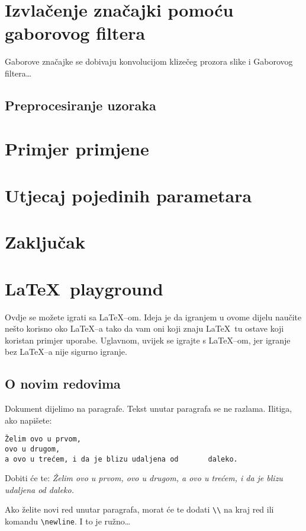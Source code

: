 \documentclass{article}
\begin{document}
\section{Izvlačenje značajki pomoću gaborovog filtera}
Gaborove značajke se dobivaju konvolucijom klizečeg prozora slike i Gaborovog
filtera\ldots

\subsection{Preprocesiranje uzoraka}

\section{Primjer primjene}

\section{Utjecaj pojedinih parametara}

\section{Zaključak}




\newpage
\appendix
\section{\LaTeX~playground}
Ovdje se možete igrati sa \LaTeX--om. Ideja je da igranjem u ovome dijelu
naučite nešto korisno oko \LaTeX--a tako da vam oni koji znaju \LaTeX~tu ostave
koji koristan primjer uporabe. Uglavnom, uvijek se igrajte s \LaTeX--om, jer igranje bez \LaTeX--a nije sigurno igranje. 

\subsection{O novim redovima}
Dokument dijelimo na paragrafe. Tekst unutar paragrafa se ne razlama. Ilitiga,
ako napišete:
\begin{verbatim}
Želim ovo u prvom,
ovo u drugom,
a ovo u trećem, i da je blizu udaljena od       daleko.
\end{verbatim}
Dobiti će te:
\emph{Želim ovo u prvom,
ovo u drugom,
a ovo u trećem, i da je blizu udaljena od       daleko.}

Ako želite novi red unutar paragrafa, morat će te dodati
\verb|\\| na kraj red ili komandu \verb|\newline|. I to je ružno\ldots
\end{document}

